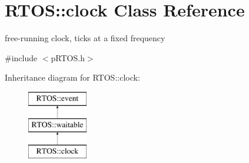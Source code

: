\hypertarget{class_r_t_o_s_1_1clock}{}\section{R\+T\+OS\+:\+:clock Class Reference}
\label{class_r_t_o_s_1_1clock}


free-\/running clock, ticks at a fixed frequency  




{\ttfamily \#include $<$p\+R\+T\+O\+S.\+h$>$}

Inheritance diagram for R\+T\+OS\+:\+:clock\+:\begin{figure}[H]
\begin{center}
\leavevmode
\includegraphics[height=3.000000cm]{class_r_t_o_s_1_1clock}
\end{center}
\end{figure}
